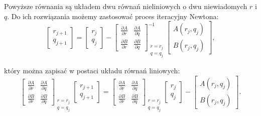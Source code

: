 \documentclass[12pt,a4paper]{article}
\begin{document}
		
		Powyższe równania są układem dwu równań nieliniowych o dwu niewiadomych $r$ i $q$. Do
		ich rozwiązania możemy zastosować proces iteracyjny Newtona:
		\[
		\begin{bmatrix}
			r_{j+1} \\
			q_{j+1}
		\end{bmatrix}
		=
		\begin{bmatrix}
			r_j \\
			q_j
		\end{bmatrix}
		-
		{\begin{bmatrix}
				\frac{\partial A}{\partial r} & \frac{\partial A}{\partial q} \\[1.5ex]
				\frac{\partial B}{\partial r} & \frac{\partial B}{\partial q}
		\end{bmatrix}}^{-1}_{\substack{r=r_j \\ q=q_j}}
		\begin{bmatrix}
			A(r_j, q_j) \\
			B(r_j, q_j)
		\end{bmatrix},
		\]
		
		który można zapisać w postaci układu równań liniowych:
		\begin{equation}
			{\begin{bmatrix}
					\frac{\partial A}{\partial r} & \frac{\partial A}{\partial q} \\[1.5ex]
					\frac{\partial B}{\partial r} & \frac{\partial B}{\partial q}
			\end{bmatrix}}_{\substack{r=r_j \\ q=q_j}}
			\begin{bmatrix}
				r_{j+1} \\
				q_{j+1}
			\end{bmatrix}
			=
			{\begin{bmatrix}
					\frac{\partial A}{\partial r} & \frac{\partial A}{\partial q} \\[1.5ex]
					\frac{\partial B}{\partial r} & \frac{\partial B}{\partial q}
			\end{bmatrix}}_{\substack{r=r_j \\ q=q_j}}
			\begin{bmatrix}
				r_j \\
				q_j
			\end{bmatrix}
			-
			\begin{bmatrix}
				A(r_j, q_j) \\
				B(r_j, q_j)
			\end{bmatrix}.
			\tag{4}
		\end{equation}
		
\end{document}
